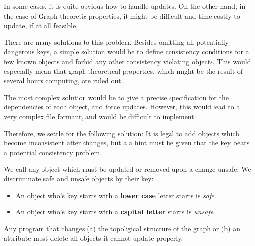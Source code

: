 In some cases, it is quite obvious how to handle updates.  On the
other hand, in the case of Graph theoretic properties, it might
be difficult and time costly to update, if at all feasible.

There are many solutions to this problem. Besides omitting all
potentially dangerous keys, a simple solution would be to define
consistency conditions for a few known objects and forbid any
other consistency violating objects.  This would especially mean
that graph theoretical properties, which might be the result of
several hours computing, are ruled out.

The most complex solution would be to give a precise
specification for the dependencies of each object, and force
updates. However, this would lead to a very complex file formant,
and would be difficult to implement.

Therefore, we settle for the following solution: It is legal to
add objects which become inconsistent after changes, but a a hint
must be given that the key bears a potential consistency problem.

\begin{definition}
  We call any object which must be updated or removed upon a
  change unsafe.  We discriminate safe and unsafe objects by
  their key:
  \begin{itemize}
    \item An object who's key starts with a \textbf{lower case} letter
    starts is \emph{safe}.
    \item An object who's key starts with a \textbf{capital letter} starts
    is \emph{unsafe}.
  \end{itemize}
  Any program that changes (a) the topoligical structure of the
  graph or (b) an attribute must delete all objects it cannot
  update properly.
\end{definition}





